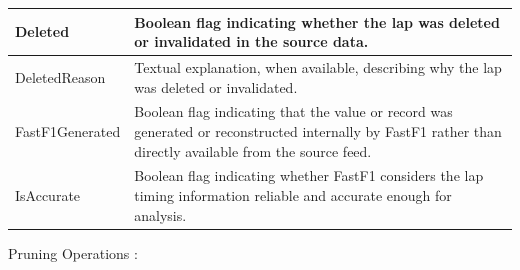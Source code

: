 \documentclass[a4paper,11pt]{article}
\begin{document}
\begin{longtable}{|p{4cm}|p{10.8cm}|}
		Deleted & Boolean flag indicating whether the lap was deleted or invalidated in the source data. \\ \hline
		
		DeletedReason & Textual explanation, when available, describing why the lap was deleted or invalidated. \\ \hline
		
		
		FastF1Generated & Boolean flag indicating that the value or record was generated or reconstructed internally by FastF1 rather than directly available from the source feed. \\ \hline
		
		
		IsAccurate & Boolean flag indicating whether FastF1 considers the lap timing information reliable and accurate enough for analysis. \\ \hline
		
	\end{longtable}
	
	
	Pruning Operations : 
	
\end{document}

